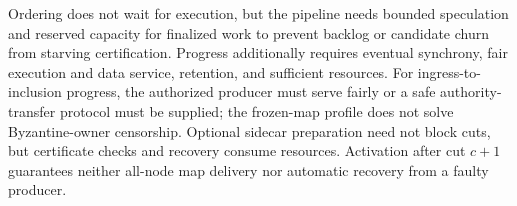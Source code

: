 Ordering does not wait for execution, but the pipeline needs bounded speculation and reserved capacity for finalized work to prevent backlog or candidate churn from starving certification. Progress additionally requires eventual synchrony, fair execution and data service, retention, and sufficient resources. For ingress-to-inclusion progress, the authorized producer must serve fairly or a safe authority-transfer protocol must be supplied; the frozen-map profile does not solve Byzantine-owner censorship. Optional sidecar preparation need not block cuts, but certificate checks and recovery consume resources. Activation after cut \(c+1\) guarantees neither all-node map delivery nor automatic recovery from a faulty producer.

